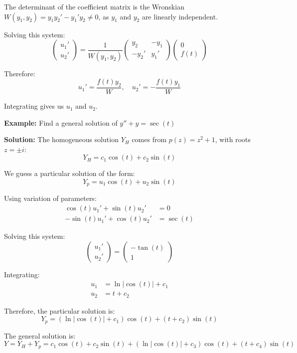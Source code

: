 \documentclass{article}
\begin{document}
The determinant of the coefficient matrix is the Wronskian $W(y_1, y_2) = y_1y_2' - y_1'y_2 \neq 0$, as $y_1$ and $y_2$ are linearly independent.

Solving this system:
\[
\begin{pmatrix}
u_1' \\
u_2'
\end{pmatrix} =
\frac{1}{W(y_1, y_2)}
\begin{pmatrix}
y_2 & -y_1 \\
-y_2' & y_1'
\end{pmatrix}
\begin{pmatrix}
0 \\
f(t)
\end{pmatrix}
\]

Therefore:
\[
u_1' = \frac{f(t)y_2}{W}, \quad u_2' = -\frac{f(t)y_1}{W}
\]

Integrating gives us $u_1$ and $u_2$.

\textbf{Example:} Find a general solution of $y'' + y = \sec(t)$

\textbf{Solution:} 
The homogeneous solution $Y_H$ comes from $p(z) = z^2 + 1$, with roots $z = \pm i$:
\[
Y_H = c_1\cos(t) + c_2\sin(t)
\]

We guess a particular solution of the form:
\[
Y_p = u_1\cos(t) + u_2\sin(t)
\]

Using variation of parameters:
\begin{align*}
\cos(t)u_1' + \sin(t)u_2' &= 0 \\
-\sin(t)u_1' + \cos(t)u_2' &= \sec(t)
\end{align*}

Solving this system:
\[
\begin{pmatrix}
u_1' \\
u_2'
\end{pmatrix} =
\begin{pmatrix}
-\tan(t) \\
1
\end{pmatrix}
\]

Integrating:
\begin{align*}
u_1 &= \ln|\cos(t)| + c_1 \\
u_2 &= t + c_2
\end{align*}

Therefore, the particular solution is:
\[
Y_p = (\ln|\cos(t)| + c_1)\cos(t) + (t + c_2)\sin(t)
\]

The general solution is:
\[
Y = Y_H + Y_p = c_1\cos(t) + c_2\sin(t) + (\ln|\cos(t)| + c_3)\cos(t) + (t + c_4)\sin(t)
\]
\end{document}

